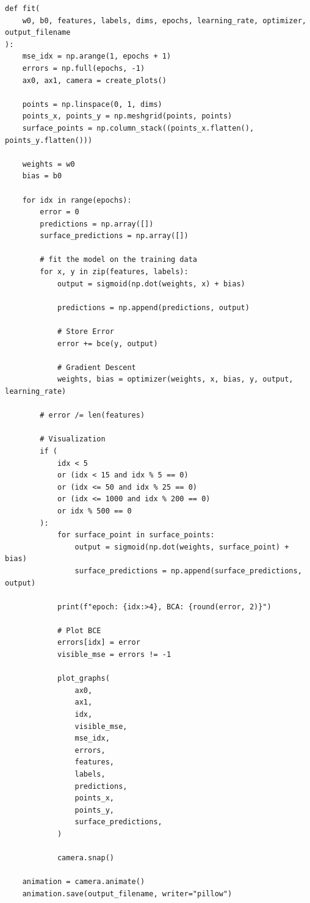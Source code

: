 \documentclass[openany]{book}
\begin{document}
\begin{tcolorbox}
\tiny
\begin{verbatim}
def fit(
    w0, b0, features, labels, dims, epochs, learning_rate, optimizer, output_filename
):
    mse_idx = np.arange(1, epochs + 1)
    errors = np.full(epochs, -1)
    ax0, ax1, camera = create_plots()

    points = np.linspace(0, 1, dims)
    points_x, points_y = np.meshgrid(points, points)
    surface_points = np.column_stack((points_x.flatten(), points_y.flatten()))

    weights = w0
    bias = b0

    for idx in range(epochs):
        error = 0
        predictions = np.array([])
        surface_predictions = np.array([])

        # fit the model on the training data
        for x, y in zip(features, labels):
            output = sigmoid(np.dot(weights, x) + bias)

            predictions = np.append(predictions, output)

            # Store Error
            error += bce(y, output)

            # Gradient Descent
            weights, bias = optimizer(weights, x, bias, y, output, learning_rate)

        # error /= len(features)

        # Visualization
        if (
            idx < 5
            or (idx < 15 and idx % 5 == 0)
            or (idx <= 50 and idx % 25 == 0)
            or (idx <= 1000 and idx % 200 == 0)
            or idx % 500 == 0
        ):
            for surface_point in surface_points:
                output = sigmoid(np.dot(weights, surface_point) + bias)
                surface_predictions = np.append(surface_predictions, output)

            print(f"epoch: {idx:>4}, BCA: {round(error, 2)}")

            # Plot BCE
            errors[idx] = error
            visible_mse = errors != -1

            plot_graphs(
                ax0,
                ax1,
                idx,
                visible_mse,
                mse_idx,
                errors,
                features,
                labels,
                predictions,
                points_x,
                points_y,
                surface_predictions,
            )

            camera.snap()

    animation = camera.animate()
    animation.save(output_filename, writer="pillow")
\end{verbatim}
\end{tcolorbox}
\end{document}
